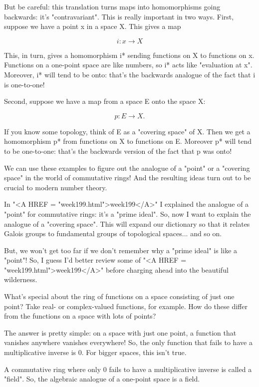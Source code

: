 But be careful: this translation turns maps into homomorphisms going
backwards: it's "contravariant".  This is really important in two 
ways. 
First, suppose we have a point x in a space X.  This gives a map


$$

i: {x} \to  X
$$
    
This, in turn, gives a homomorphism i* sending functions on X to 
functions on {x}.  Functions on a one-point space are like numbers, 
so i* acts like "evaluation at x".   Moreover, i* will tend to be 
onto: that's the backwards analogue of the fact that i is one-to-one!

Second, suppose we have a map from a space E onto the space X: 


$$

p: E \to  X.
$$
    
If you know some topology, think of E as a "covering space" of X.  
Then 
we get a homomorphism p* from functions on X to functions on E.  Moreover
p* will tend to be one-to-one: that's the backwards version of the fact 
that p was onto!

We can use these examples to figure out the analogue of a "point" or a 
"covering space" in the world of commutative rings!  And the resulting
ideas turn out to be crucial to modern number theory.  

In "<A HREF = "week199.html">week199</A>" I explained the analogue of a "point" for commutative rings: 
it's a "prime ideal".  So, now I want to explain the analogue of a
"covering space".  This will expand our dictionary so that it relates 
Galois groups to fundamental groups of topological spaces... and so on.  

But, we won't get too far if we don't remember why a "prime ideal" is
like a "point"!  So, I guess I'd better review some of "<A HREF = "week199.html">week199</A>" before 
charging ahead into the beautiful wilderness.

What's special about the ring of functions on a space consisting of 
just one point?   Take real- or complex-valued functions, for example.
How do these differ from the functions on a space with lots of points?

The answer is pretty simple: on a space with just one point, a function
that vanishes anywhere vanishes everywhere!  So, the only function
that fails to have a multiplicative inverse is 0.  For bigger spaces,
this isn't true.

A commutative ring where only 0 fails to have a multiplicative inverse
is called a "field".  So, the algebraic analogue of a one-point 
space is a field. 

